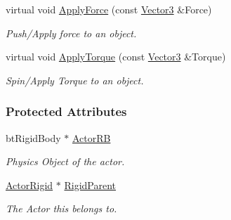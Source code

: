 \begin{DoxyCompactItemize}
virtual void \hyperlink{classphys_1_1ActorRigidPhysicsSettings_a3738b083fd0c21e07176c302f63ce993}{ApplyForce} (const \hyperlink{classphys_1_1Vector3}{Vector3} \&Force)
\begin{DoxyCompactList}\small\item\em Push/Apply force to an object. \item\end{DoxyCompactList}\item 
virtual void \hyperlink{classphys_1_1ActorRigidPhysicsSettings_ad95f1a52c00ab5af3add795b547970a5}{ApplyTorque} (const \hyperlink{classphys_1_1Vector3}{Vector3} \&Torque)
\begin{DoxyCompactList}\small\item\em Spin/Apply Torque to an object. \item\end{DoxyCompactList}\end{DoxyCompactItemize}
\subsubsection*{Protected Attributes}
\begin{DoxyCompactItemize}
\item 
\hypertarget{classphys_1_1ActorRigidPhysicsSettings_af92d6c9108279828425390b02612861f}{
btRigidBody $\ast$ \hyperlink{classphys_1_1ActorRigidPhysicsSettings_af92d6c9108279828425390b02612861f}{ActorRB}}
\label{classphys_1_1ActorRigidPhysicsSettings_af92d6c9108279828425390b02612861f}

\begin{DoxyCompactList}\small\item\em Physics Object of the actor. \item\end{DoxyCompactList}\item 
\hypertarget{classphys_1_1ActorRigidPhysicsSettings_a8fe8b3e8632c9ae82fdd091f9628690b}{
\hyperlink{classphys_1_1ActorRigid}{ActorRigid} $\ast$ \hyperlink{classphys_1_1ActorRigidPhysicsSettings_a8fe8b3e8632c9ae82fdd091f9628690b}{RigidParent}}
\label{classphys_1_1ActorRigidPhysicsSettings_a8fe8b3e8632c9ae82fdd091f9628690b}

\begin{DoxyCompactList}\small\item\em The Actor this belongs to. \item\end{DoxyCompactList}\end{DoxyCompactItemize}


